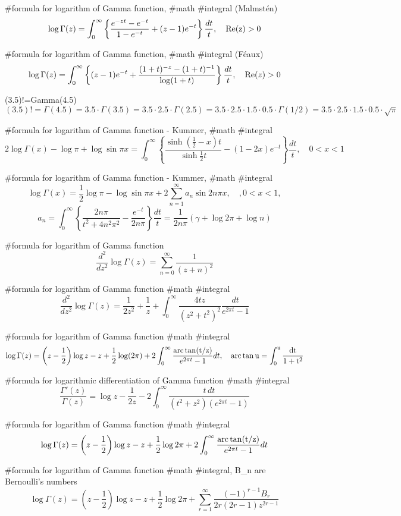 #formula for logarithm of Gamma function, #math #integral (Malmstén)
$$
\log \Gamma(z)=\int^\infty_0 \left\{\frac{e^{-zt}-e^{-t}}{1-e^{-t}}+(z-1)e^{-t}\right\}\frac{dt}{t}, \quad \rm{Re}(z)>0
$$

#formula for logarithm of Gamma function, #math #integral (Féaux)
$$
\log \Gamma(z)=\int^\infty_0 \left\{(z-1)e^{-t}+\frac{(1+t)^{-z}-(1+t)^{-1}}{\log(1+t)}\right\}\frac{dt}{t}, \quad {\rm Re}(z)>0
$$

(3.5)!=Gamma(4.5)
$$
(3.5)!=\Gamma(4.5)=3.5\cdot  \Gamma(3.5)=3.5\cdot 2.5 \cdot \Gamma(2.5)=3.5\cdot 2.5\cdot 1.5 \cdot 0.5 \cdot \Gamma(1/2)= 3.5\cdot 2.5\cdot 1.5 \cdot 0.5 \cdot \sqrt{\pi}
$$

#formula for logarithm of Gamma function - Kummer, #math #integral
$$
2\log\Gamma(x)-\log\pi+\log\sin\pi x=\int^\infty_0\left\{\frac{\sinh (\frac{1}{2}-x)t}{\sinh\frac{1}{2}t}-(1-2x)e^{-t}\right\}\frac{dt}{t},\quad 0<x<1
$$

#formula for logarithm of Gamma function - Kummer, #math #integral
$$
\log\Gamma(x)=\frac{1}{2}\log\pi-\log\sin\pi x+2\sum^\infty_{n=1}a_n \sin 2n\pi x,\quad,0<x<1,
$$
$$
a_n=\int^\infty_0\left\{\frac{2n\pi}{t^2+4n^2\pi^2}-\frac{e^{-t}}{2n\pi}\right\}\frac{dt}{t}=\frac{1}{2n\pi}(\gamma+\log 2\pi+\log n)
$$

#formula for logarithm of Gamma function
$$
\frac{d^2}{dz^2}\log\Gamma(z)=\sum^\infty_{n=0}\frac{1}{(z+n)^2}
$$

#formula for logarithm of Gamma function #math #integral
$$
\frac{d^2}{dz^2}\log\Gamma(z)=\frac{1}{2z^2}+\frac{1}{z}+\int^\infty_0\frac{4tz}{(z^2+t^2)^2}\frac{dt}{e^{2\pi t}-1}
$$

#formula for logarithm of Gamma function #math #integral
$$
\log\Gamma(z)=\left(z-\frac{1}{2}\right)\log z-z+\frac{1}{2}\log(2\pi)+2\int^\infty_0\frac{\rm{arc}\tan(t/z)}{e^{2\pi t}-1}dt, \quad \rm{arc}\tan u=\int^u_0 \frac{dt}{1+t^2}
$$

#formula for logarithmic differentiation of Gamma function #math #integral
$$
\frac{\Gamma'(z)}{\Gamma(z)}=\log z-\frac{1}{2z}-2\int^\infty_0\frac{t\,dt}{(t^2+z^2)(e^{2\pi t}-1)}
$$

#formula for logarithm of Gamma function #math #integral
$$
\log \Gamma(z)=\left(z-\frac{1}{2}\right)\log z -z +\frac{1}{2}\log 2\pi +2\int^\infty_0\frac{\rm{arc}\tan (t/z)}{e^{2\pi t}-1}dt
$$

#formula for logarithm of Gamma function #math #integral, B_n are Bernoulli’s numbers
$$
\log \Gamma(z)=\left(z-\frac{1}{2}\right)\log z -z +\frac{1}{2}\log 2\pi +\sum^\infty_{r=1} \frac{(-1)^{r-1}B_r}{2r(2r-1)z^{2r-1}}
$$

